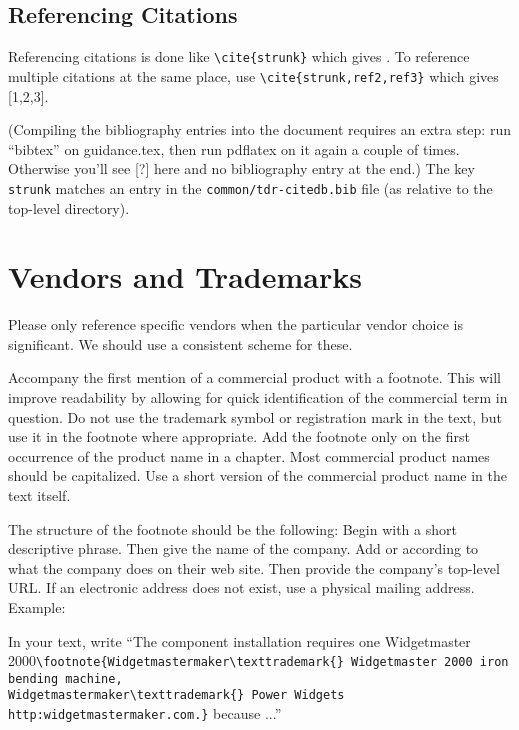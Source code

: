 \subsection{Referencing Citations}
\label{sec:latex-ref}

Referencing citations is done like \verb|\cite{strunk}| which gives \cite{strunk}.
To reference multiple citations at the same place, use \verb|\cite{strunk,ref2,ref3}| which gives  [1,2,3].

(Compiling the bibliography entries into the document requires an extra step: run ``bibtex'' on
 guidance.tex, then run pdflatex on it again a couple of times. Otherwise you'll see [?] here 
 and no bibliography entry at the end.) 
The key \texttt{strunk} matches an entry in the \texttt{common/tdr-citedb.bib}
file (as relative to the top-level directory).

\section{Vendors and Trademarks}
\label{sec:trademarks}

Please only reference specific vendors when the particular vendor choice is significant. 
We should use a consistent scheme for these. 
 
Accompany the first mention of a commercial product with a footnote.  This will improve readability by allowing for quick identification of the commercial term in question. 
Do not use the trademark symbol \texttrademark{} or registration mark \textregistered{} in the text, but use it in the footnote where appropriate. Add the footnote only on the first occurrence of the product name in a chapter.
Most commercial product names should be capitalized.
Use a short version of the commercial product name in the text itself.
 
The structure of the footnote should be the following:
Begin with a short descriptive phrase.  Then give the name of the company.  Add \texttrademark{} or  \textregistered{} according to what the company does on their web site. Then provide the company's top-level URL. If an electronic address does not exist, use a physical mailing address. Example:

In your text, write ``The component installation requires one Widgetmaster \\
2000\verb|\footnote{Widgetmastermaker\texttrademark{} Widgetmaster 2000 iron bending machine, | \\
\verb|Widgetmastermaker\texttrademark{} Power Widgets http:widgetmastermaker.com.}| because ...''

